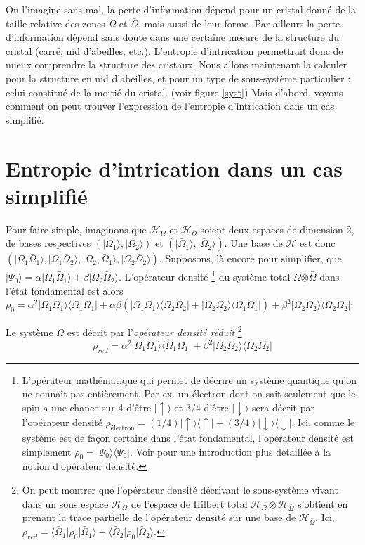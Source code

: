 \documentclass[a4paper, french]{report}
\newcommand{\ket}[1]{\ensuremath{|#1\rangle}\xspace}
\newcommand{\bra}[1]{\ensuremath{\langle #1|}\xspace}
\newcommand{\fond}{\ensuremath{| \Psi_0 \rangle}\xspace}
\newcommand{\om}{\ensuremath{\Omega}\xspace}
\newcommand{\bom}{\ensuremath{\bar{\Omega}}\xspace}
\newcommand{\1}{\ensuremath{\ket{\om_1\bom_1}}\xspace}
\newcommand{\2}{\ensuremath{\ket{\om_2\bom_2}}\xspace}
\newcommand{\spinu}{\ensuremath{\ket{\uparrow}}\xspace}
\newcommand{\spind}{\ensuremath{\ket{\downarrow}}\xspace}
\newcommand{\dens}{\ensuremath{\rho_0}\xspace}
\newcommand{\dred}{\ensuremath{\rho_{red}}\xspace}
\begin{document}
On l'imagine sans mal, la perte d'information dépend pour un cristal donné de la taille relative des zones \om et \bom, mais aussi de leur forme. Par ailleurs la perte d'information dépend sans doute dans une certaine mesure de la structure du cristal (carré, nid d'abeilles, etc.). L'entropie d'intrication permettrait donc de mieux comprendre la structure des cristaux. Nous allons maintenant la calculer pour la structure en nid d'abeilles, et pour un type de sous-système particulier : celui constitué de la moitié du cristal. (voir figure \ref{syst})
Mais d'abord, voyons comment on peut trouver l'expression de l'entropie d'intrication dans un cas simplifié.

\section{Entropie d'intrication dans un cas simplifié}
Pour faire simple, imaginons que $\mathcal H_{\om}$ et $\mathcal H_{\bom}$ soient deux espaces de dimension 2, de bases respectives $(\ket{\om_1},\ket{\om_2})$ et $(\ket{\bom_1},\ket{\bom_2})$. Une base de $\mathcal H$ est donc $(\1,\ket{\om_1\bom_2},\ket{\om_2,\bom_1},\2)$. Supposons, là encore pour simplifier, que $\fond=\alpha\1+\beta\2$. L'opérateur densité \footnote{L'opérateur mathématique qui permet de décrire un système quantique qu'on ne connaît pas entièrement. Par ex. un électron dont on sait seulement que le spin a une chance sur 4 d'être \spinu et $3/4$ d'être \spind sera décrit par l'opérateur densité $\rho_{\text{électron}}=(1/4)\spinu\bra \uparrow+(3/4)\spind\bra \downarrow$. Ici, comme le système est de façon certaine dans l'état fondamental, l'opérateur densité est simplement $\dens=\fond\bra{\Psi_0}$. Voir \cite[pages~447-456]{basdevant} pour une introduction plus détaillée à la notion d'opérateur densité.} du système total \om$\otimes$\bom dans l'état fondamental est alors $\dens=\alpha^2\1\bra{\om_1\bom_1}+\alpha\beta(\1\bra{\om_2 \bom_2}+\2\bra{\om_1\bom_1})+\beta^2\2\bra{\om_2\bom_2}$.

Le système \om est décrit par l'\emph{opérateur densité réduit} \footnote{On peut montrer que l'opérateur densité décrivant le sous-système vivant dans un sous espace $\mathcal H_{\om}$ de l'espace de Hilbert total $\mathcal H_{\om}\otimes \mathcal H_{\bom}$ s'obtient en prenant la trace partielle de l'opérateur densité sur une base de $\mathcal H_{\bom}$. Ici, $\dred=\bra{\bom_1}\dens \ket{\bom_1}+\bra{\bom_2}\dens \ket{\bom_2}$.}
\[
	\dred=\alpha^2\1\bra{\om_1\bom_1}+\beta^2\2\bra{\om_2\bom_2}
\]
\end{document}
